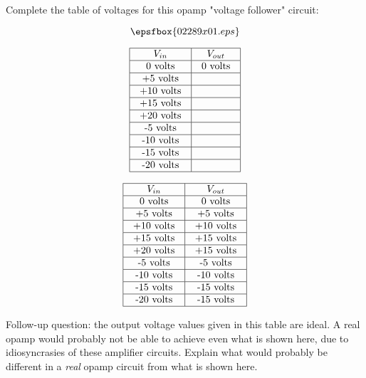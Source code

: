 

Complete the table of voltages for this opamp "voltage follower" circuit:

$$\epsfbox{02289x01.eps}$$


$$\vbox{\offinterlineskip
\halign{\strut
\vrule \quad\hfil # \ \hfil & 
\vrule \quad\hfil # \ \hfil \vrule \cr
\noalign{\hrule}
%
$V_{in}$ & $V_{out}$ \cr
%
\noalign{\hrule}
%
0 volts & 0 volts \cr
%
\noalign{\hrule}
%
+5 volts &  \cr
%
\noalign{\hrule}
%
+10 volts &  \cr
%
\noalign{\hrule}
%
+15 volts &  \cr
%
\noalign{\hrule}
%
+20 volts &  \cr
%
\noalign{\hrule}
%
-5 volts &  \cr
%
\noalign{\hrule}
%
-10 volts &  \cr
%
\noalign{\hrule}
%
-15 volts &  \cr
%
\noalign{\hrule}
%
-20 volts &  \cr
%
\noalign{\hrule}
} %
}$$ %








$$\vbox{\offinterlineskip
\halign{\strut
\vrule \quad\hfil # \ \hfil & 
\vrule \quad\hfil # \ \hfil \vrule \cr
\noalign{\hrule}
%
$V_{in}$ & $V_{out}$ \cr
%
\noalign{\hrule}
%
0 volts & 0 volts \cr
%
\noalign{\hrule}
%
+5 volts & +5 volts \cr
%
\noalign{\hrule}
%
+10 volts & +10 volts \cr
%
\noalign{\hrule}
%
+15 volts & +15 volts \cr
%
\noalign{\hrule}
%
+20 volts & +15 volts \cr
%
\noalign{\hrule}
%
-5 volts & -5 volts \cr
%
\noalign{\hrule}
%
-10 volts & -10 volts \cr
%
\noalign{\hrule}
%
-15 volts & -15 volts \cr
%
\noalign{\hrule}
%
-20 volts & -15 volts \cr
%
\noalign{\hrule}
} %
}$$ %

\vskip 10pt

Follow-up question: the output voltage values given in this table are ideal.  A real opamp would probably not be able to achieve even what is shown here, due to idiosyncrasies of these amplifier circuits.  Explain what would probably be different in a {\it real} opamp circuit from what is shown here.

